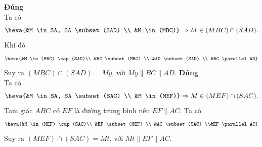 \begin{ex}
{\begin{itemchoice}
			\itemch \textbf{Đúng}\\ 
			Ta  có
			 \[
			\heva{&M \in SA, SA \subset (SAD) \\ &M \in (MBC)} 
			 \Rightarrow M \in (MBC) \cap (SAD).
			 \]
			Khi  đó
			 \[
			 \heva{&M \in (MBC) \cap (SAD)\\ &BC \subset (MBC) \\ &AD \subset (SAD) \\ &BC \parallel AD}
			 \]
			Suy ra $(MBC) \cap (SAD)=My$, với $My \parallel BC \parallel AD$. 
			\itemch \textbf{Đúng} \\ 
			Ta  có
			\[ 
			\heva{&M \in  SA, SA \subset (SAC) \\ &M \in (MEF)}
			 \Rightarrow M \in (MEF) \cap (SAC).
			 \]
			Tam giác  $ABC$ có $EF$ là đường trung bình nên $EF \parallel AC$.
			 Ta có
			 \[
			\heva{&M \in (MEF) \cap (SAC)\\ &EF \subset (MEF) \\ &AC \subset (SAC)  \\&EF \parallel AC}
			\] 
			Suy ra $(MEF) \cap (SAC)=Mt$, với $Mt \parallel EF \parallel  AC$.
		\end{itemchoice}
	} 
\end{ex}

